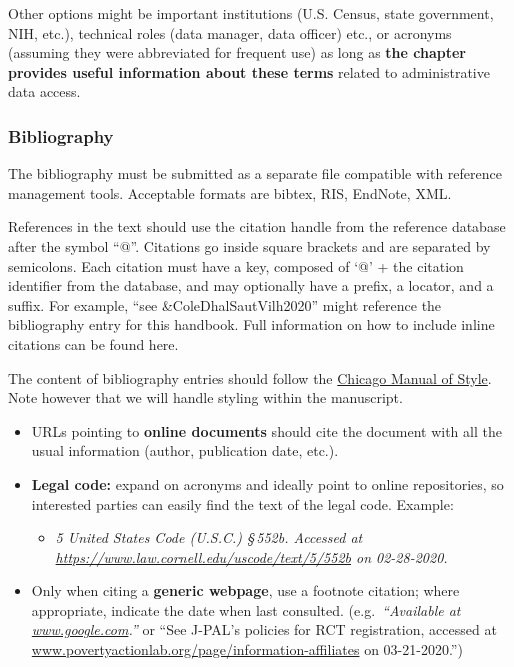 \documentclass[
]{WileySix}
\providecommand{\tightlist}{%
  \setlength{\itemsep}{0pt}\setlength{\parskip}{0pt}}
\begin{document}
Other options might be important institutions (U.S. Census, state government, NIH, etc.), technical roles (data manager, data officer) etc., or acronyms (assuming they were abbreviated for frequent use) as long as \textbf{the chapter provides useful information about these terms} related to administrative data access.

\hypertarget{bibliography}{%
\subsubsection*{Bibliography}\label{bibliography}}

The bibliography must be submitted as a separate file compatible with reference management tools. Acceptable formats are bibtex, RIS, EndNote, XML.

References in the text should use the citation handle from the reference database after the symbol ``@''. Citations go inside square brackets and are separated by semicolons. Each citation must have a key, composed of `@' + the citation identifier from the database, and may optionally have a prefix, a locator, and a suffix. For example, ``see \&ColeDhalSautVilh2020'' might reference the bibliography entry for this handbook. Full information on how to include inline citations can be found here.

The content of bibliography entries should follow the \href{https://www.chicagomanualofstyle.org/tools_citationguide/citation-guide-2.html}{Chicago Manual of Style}. Note however that we will handle styling within the manuscript.

\begin{itemize}
\tightlist
\item
  URLs pointing to \textbf{online documents} should cite the document with all the usual information (author, publication date, etc.).
\item
  \textbf{Legal code:} expand on acronyms and ideally point to online repositories, so interested parties can easily find the text of the legal code. Example:

  \begin{itemize}
  \tightlist
  \item
    \emph{5 United States Code (U.S.C.) §\,552b. Accessed at} \emph{\url{https://www.law.cornell.edu/uscode/text/5/552b} on 02-28-2020.}
  \end{itemize}
\item
  Only when citing a \textbf{generic webpage}, use a footnote citation; where appropriate, indicate the date when last consulted. (e.g.~\emph{``Available at \href{http://www.google.com/}{www.google.com}.''} or ``See J-PAL's policies for RCT registration, accessed at \href{http://www.povertyactionlab.org/page/information-affiliates}{www.povertyactionlab.org/page/information-affiliates} on 03-21-2020.'')
\end{itemize}
\end{document}
